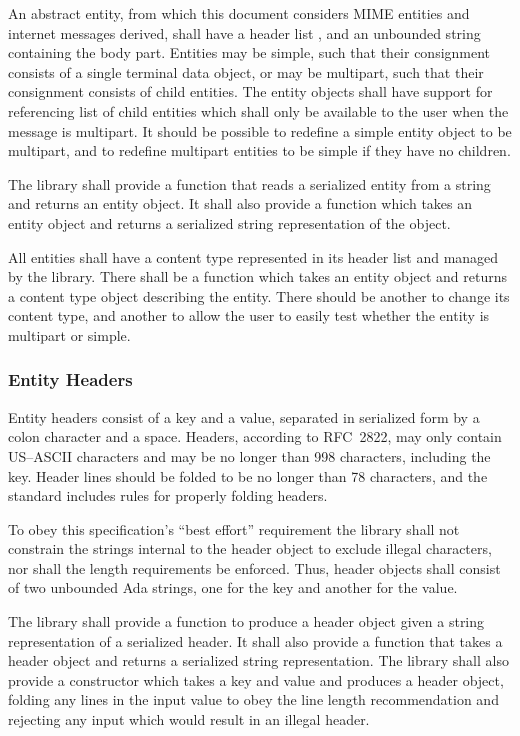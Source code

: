\documentclass[11pt]{article}
\begin{document}
An abstract entity, from which this document considers MIME entities
and internet messages derived, shall have a header list
, and an unbounded string containing the body
part. Entities may be simple, such that their consignment consists of
a single terminal data object, or may be multipart, such that their
consignment consists of child entities. The entity objects shall have
support for referencing list of child entities which shall only be
available to the user when the message is multipart. It should be
possible to redefine a simple entity object to be multipart, and to
redefine multipart entities to be simple if they have no children.

The library shall provide a function that reads a serialized entity
from a string and returns an entity object. It shall also provide a
function which takes an entity object and returns a serialized string
representation of the object.

All entities shall have a content type represented in its header list
and managed by the library. There shall be a function which takes an
entity object and returns a content type object describing the
entity. There should be another to change its content type, and
another to allow the user to easily test whether the entity is
multipart or simple.


\subsubsection{Entity Headers}
\label{pi:headers}

Entity headers consist of a key and a value, separated in serialized
form by a colon character and a space. Headers, according to RFC~2822,
may only contain US--ASCII characters and may be no longer than 998
characters, including the key. Header lines should be folded to be no
longer than 78 characters, and the standard includes rules for
properly folding headers.

To obey this specification's ``best effort'' requirement
 the library shall not constrain the strings
internal to the header object to exclude illegal characters, nor shall
the length requirements be enforced. Thus, header objects shall
consist of two unbounded Ada strings, one for the key and another for
the value.

The library shall provide a function to produce a header object given
a string representation of a serialized header. It shall also provide
a function that takes a header object and returns a serialized string
representation. The library shall also provide a constructor which
takes a key and value and produces a header object, folding any lines
in the input value to obey the line length recommendation and
rejecting any input which would result in an illegal header.
\end{document}
